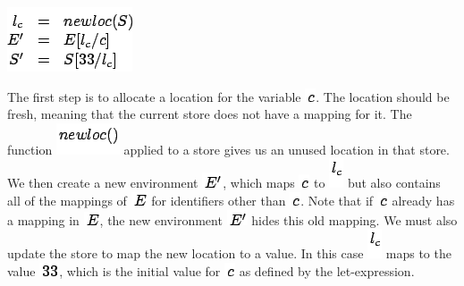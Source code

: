 \documentclass[]{article}
\begin{document}
\includegraphics{img136.png}

The first step is to allocate a location for the variable
\includegraphics{img134.png}. The location should be fresh, meaning that
the current store does not have a mapping for it. The function
\includegraphics{img137.png} applied to a store gives us an unused
location in that store. We then create a new environment
\includegraphics{img135.png}, which maps \includegraphics{img134.png} to
\includegraphics{img138.png} but also contains all of the mappings of
\includegraphics{img125.png} for identifiers other than
\includegraphics{img134.png}. Note that if \includegraphics{img134.png}
already has a mapping in \includegraphics{img125.png}, the new
environment \includegraphics{img135.png} hides this old mapping. We must
also update the store to map the new location to a value. In this case
\includegraphics{img138.png} maps to the value
\includegraphics{img139.png}, which is the initial value for
\includegraphics{img134.png} as defined by the let-expression.
\end{document}
